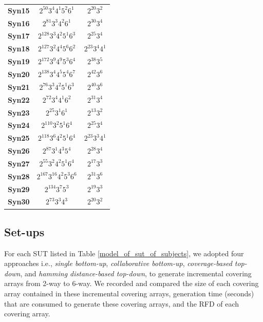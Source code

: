 \documentclass[conference]{IEEEtran}
\theoremstyle{definition}
\begin{document}
\begin{table}[!ht]
\begin{tabular}{|c|c|c|}
    \textbf{Syn15} & $2^{50}3^{4}4^{1}5^{2}6^{1}$ & $2^{20}3^{2}$ \\
    \textbf{Syn16} & $2^{81}3^{3}4^{2}6^{1}$ & $2^{30}3^{4}$\\
    \textbf{Syn17} & $2^{128}3^{3}4^{2}5^{1}6^{3}$ & $2^{25}3^{4}$ \\
    \textbf{Syn18} & $2^{127}3^{2}4^{4}5^{6}6^{2}$ & $2^{23}3^{4}4^{1}$ \\
    \textbf{Syn19} & $2^{172}3^{9}4^{9}5^{3}6^{4}$ & $2^{38}3^{5}$\\
    \textbf{Syn20} & $2^{138}3^{4}4^{5}5^{4}6^{7}$ & $2^{42}3^{6}$ \\
    \textbf{Syn21} & $2^{76}3^{3}4^{2}5^{1}6^{3}$ & $2^{40}3^{6}$ \\
    \textbf{Syn22} & $2^{72}3^{4}4^{1}6^{2}$ & $2^{31}3^{4}$\\
    \textbf{Syn23} & $2^{25}3^{1}6^{1}$ & $2^{13}3^{2}$ \\
    \textbf{Syn24} & $2^{110}3^{2}5^{1}6^{4}$ & $2^{25}3^{4}$ \\
    \textbf{Syn25} & $2^{118}3^{6}4^{2}5^{1}6^{4}$ & $2^{23}3^{3}4^{1}$ \\
    \textbf{Syn26} & $2^{87}3^{1}4^{3}5^{4}$ & $2^{28}3^{4}$ \\
    \textbf{Syn27} & $2^{55}3^{2}4^{2}5^{1}6^{4}$ & $2^{17}3^{3}$  \\
    \textbf{Syn28} & $2^{167}3^{16}4^{2}5^{3}6^{6}$ & $2^{31}3^{6}$ \\
    \textbf{Syn29} & $2^{134}3^{7}5^{3}$ & $2^{19}3^{3}$ \\
    \textbf{Syn30} & $2^{73}3^{3}4^{3}$ & $2^{20}3^{2}$ \\
    \hline
    \end{tabular}%
  \end{table}



\subsection{Set-ups}
For each SUT listed in Table \ref{model_of_sut_of_subjects}, we adopted four approaches i.e., \emph{single bottom-up}, \emph{collaborative bottom-up}, \emph{coverage-based top-down}, and \emph{hamming distance-based top-down}, to generate incremental covering arrays from 2-way to 6-way. We recorded and compared the size of each covering array contained in these incremental covering arrays, generation time (seconds) that are consumed to generate these covering arrays, and the RFD of each covering array.
\end{document}
